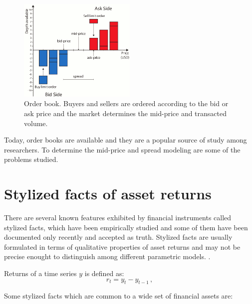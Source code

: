 \begin{figure}[!h]
  \centering
  \includegraphics[width=0.5\textwidth]{img/orderbook}
  \caption{Order book. Buyers and sellers are ordered according to the bid or
  ask price and the market determines the mid-price and transacted volume.}
  \label{fig:orderbook}
\end{figure}

Today, order books are available and they are a popular source of study among
researchers. To determine the mid-price and spread modeling are some of the
problems studied.




\section{Stylized facts of asset returns}
\label{sec:stylizedfacts}

There are several known features exhibited by financial instruments called
stylized facts, which have been empirically studied and some of them have been
documented only recently and accepted as truth. Stylized facts are usually
formulated in terms of qualitative properties of asset returns and may not be
precise enought to distinguish among different parametric models.
\cite{cont2001}.

Returns of a time series $y$ is defined as:
\begin{equation}
\label{eq:returndef}
r_t = y_t - y_{t-1}  \, ,
\end{equation}

Some stylized facts which are common to a wide set of financial assets
\cite{sewell2011} are:

